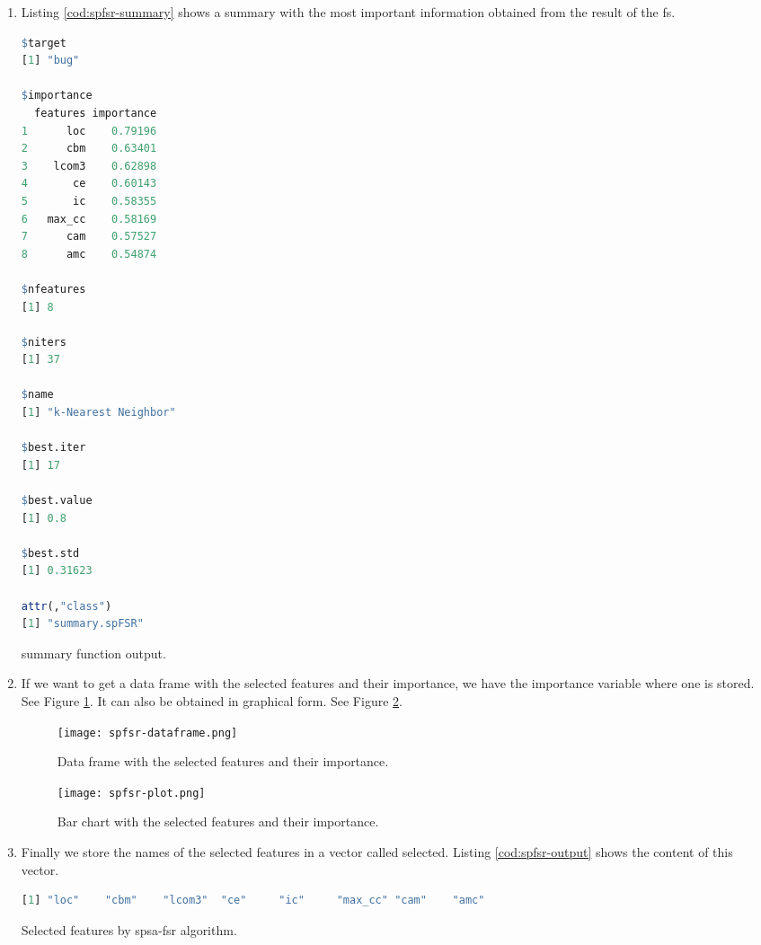 \begin{enumerate}
    \item Listing \ref{cod:spfsr-summary} shows a summary with the most important information obtained from the result of the \acrshort{fs}.

\begin{codefloat}[H]
\begin{lstlisting}[language=R, style=console]
$target
[1] "bug"

$importance
  features importance
1      loc    0.79196
2      cbm    0.63401
3    lcom3    0.62898
4       ce    0.60143
5       ic    0.58355
6   max_cc    0.58169
7      cam    0.57527
8      amc    0.54874

$nfeatures
[1] 8

$niters
[1] 37

$name
[1] "k-Nearest Neighbor"

$best.iter
[1] 17

$best.value
[1] 0.8

$best.std
[1] 0.31623

attr(,"class")
[1] "summary.spFSR"
\end{lstlisting}
\caption{summary function output.}
\label{cod:spfsr-summary}
\end{codefloat}

    \item If we want to get a data frame with the selected features and their importance, we have the importance variable where one is stored. See Figure \ref{fig:spfsr-dataframe}. It can also be obtained in graphical form. See Figure \ref{fig:spfsr-plot}.
    
    \begin{figure}[H]
        \centering
        \texttt{[image: spfsr-dataframe.png]}
        \caption{Data frame with the selected features and their importance.}
        \label{fig:spfsr-dataframe}
    \end{figure}
    
    \begin{figure}[H]
        \centering
        \texttt{[image: spfsr-plot.png]}
        \caption{Bar chart with the selected features and their importance.}
        \label{fig:spfsr-plot}
    \end{figure}
    
    \item Finally we store the names of the selected features in a vector called selected. Listing \ref{cod:spfsr-output} shows the content of this vector.

\begin{codefloat}[H]
\begin{lstlisting}[language=R, style=console]
[1] "loc"    "cbm"    "lcom3"  "ce"     "ic"     "max_cc" "cam"    "amc"  
\end{lstlisting}
\caption{Selected features by \acrshort{spsa-fsr} algorithm.}
\label{cod:spfsr-output}
\end{codefloat}

\end{enumerate}

